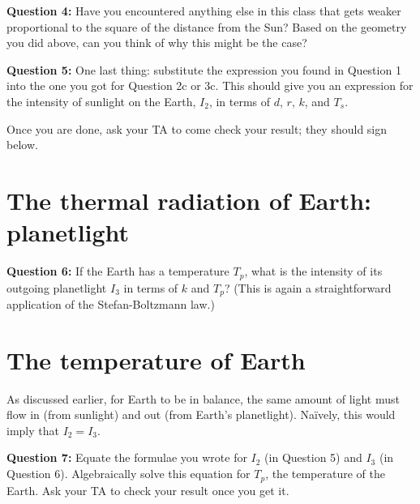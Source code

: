 \documentclass[11pt]{article}
\begin{document}
\bigskip
\bigskip

{\bf Question 4:} Have you encountered anything else in this class that gets weaker proportional to the square of the distance from the Sun? Based on the geometry you did above, can you
think of why this might be the case?

\vspace*{4cm}

\hrulefill

{\bf Question 5:} One last thing: substitute the expression you found in Question 1 into the one you got for Question 2c or 3c. This should give you an expression for the intensity of
sunlight on the Earth, $I_2$, in terms of $d$, $r$, $k$, and $T_s$.

\vspace*{3cm}

\hrulefill

Once you are done, ask your TA to come check your result; they should sign below.




\section*{The thermal radiation of Earth: planetlight}

{\bf Question 6:} If the Earth has a temperature $T_p$, what is the intensity of its outgoing planetlight $I_3$ in terms of $k$ and $T_p$? (This is again a straightforward application of the Stefan-Boltzmann law.)

\vspace*{3cm}

\hrulefill
\newpage

\section*{The temperature of Earth}

As discussed earlier, for Earth to be in balance, the same amount of light must flow in (from sunlight) and out (from Earth's planetlight). Na\"{i}vely, this would imply that
$I_2=I_3$. 

{\bf Question 7:} Equate the formulae you wrote for $I_2$ (in Question 5) and $I_3$ (in Question 6). Algebraically solve this equation for $T_p$, the temperature of the Earth. Ask your 
TA to check your result once you get it.

\vspace*{5cm}

\hrulefill
\end{document}
